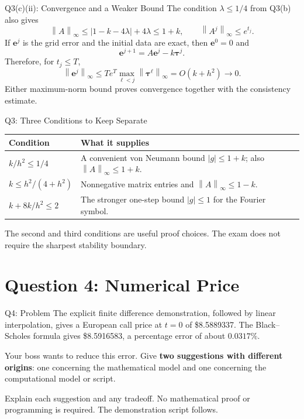\documentclass{beamer}
\newcommand{\norm}[1]{\left\|#1\right\|}
\begin{document}
\begin{frame}{Q3(c)(ii): Convergence and a Weaker Bound}
The condition $\lambda\leq1/4$ from Q3(b) also gives
\[
\norm{A}_\infty
\leq |1-k-4\lambda|+4\lambda
\leq1+k,
\qquad
\norm{A^j}_\infty\leq e^{t_j}.
\]
If $\bm e^j$ is the grid error and the initial data are exact,
then $\bm e^0=0$ and
\[
\bm e^{j+1}=A\bm e^j-k\bm\tau^j.
\]
Therefore, for $t_j\leq T$,
\[
\norm{\bm e^j}_\infty
\leq T e^T\max_{\ell<j}\norm{\bm\tau^\ell}_\infty
=O(k+h^2)\longrightarrow0.
\]
Either maximum-norm bound proves convergence together with
the consistency estimate.
\end{frame}

\begin{frame}{Q3: Three Conditions to Keep Separate}
\begin{center}
\begin{tabular}{p{}p{}}
\toprule
Condition & What it supplies\\
\midrule
$\displaystyle k/h^2\leq1/4$ & A convenient von Neumann bound
$|g|\leq1+k$; also $\norm{A}_\infty\leq1+k$.\\[0.25cm]
$\displaystyle k\leq h^2/(4+h^2)$ & Nonnegative matrix entries and
$\norm{A}_\infty\leq1-k$.\\[0.25cm]
$\displaystyle k+8k/h^2\leq2$ & The stronger one-step bound
$|g|\leq1$ for the Fourier symbol.\\
\bottomrule
\end{tabular}
\end{center}
The second and third conditions are useful proof choices.
The exam does not require the sharpest stability boundary.
\end{frame}

\section{Question 4: Numerical Price}

\begin{frame}{Q4: Problem}
\small
The explicit finite difference demonstration, followed by linear
interpolation, gives a European call price at $t=0$ of
\$8.5889337. The Black--Scholes formula gives \$8.5916583,
a percentage error of about $0.0317\%$.

\medskip
Your boss wants to reduce this error. Give \textbf{two suggestions
with different origins}: one concerning the mathematical model and
one concerning the computational model or script.

\medskip
Explain each suggestion and any tradeoff. No mathematical proof or
programming is required. The demonstration script follows.
\end{frame}
\end{document}

